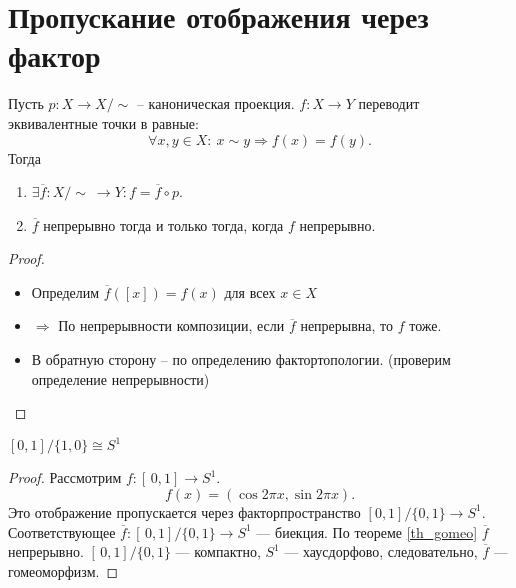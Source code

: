 \documentclass[11pt]{book}
\theoremstyle{definition}
\theoremstyle{plain}
\theoremstyle{plain}
\theoremstyle{definition}
\theoremstyle{remark}
\begin{document}
\section{Пропускание отображения через фактор}
\begin{thm}\label{th_gomeo}
    Пусть $ p : X \to  X/ \!\sim $ -- каноническая проекция. $ f: X \to  Y$ переводит эквивалентные точки в равные:
    \[
	\forall  x, y \in  X: ~ x \sim y \Longrightarrow f(x) = f(y)
    .\]
    Тогда
    \begin{enumerate}
	\item $ \exists  \overline{f}: X /\!\sim~ \to  Y: f = \overline{f} \circ p$.
	\item  $ \overline{f}$ непрерывно тогда и только тогда, когда  $ f$ непрерывно.
    \end{enumerate}
\end{thm}
\begin{proof}
    $ $
    \begin{itemize}
	\item Определим $ \overline{f}([x]) = f(x)$ для всех $ x \in X$
	\item $ \boxed{ \Longrightarrow }$ По непрерывности композиции, если $ \overline{f}$ непрерывна, то $ f$ тоже.
	\item \boxed{ \Longleftarrow } В обратную сторону -- по определению фактортопологии. (проверим определение непрерывности)
    \end{itemize}
\end{proof}
\begin{thm}
    $ [0, 1] / \{1, 0\} \cong S^{1}$
\end{thm}
\begin{proof}
    Рассмотрим $ f: [\,0,1] \to  S^{1}$.
    \[
	f(x) = (\cos 2\pi x, \sin 2 \pi x)
    .\]
    Это отображение пропускается через факторпространство $ [0, 1]/\{0, 1\} \to  S^{1}$.
    Соответствующее $ \overline{f}: [\,0, 1] /\{0, 1\} \to  S^{1}$ --- биекция. По теореме \ref{th_gomeo} $ \overline{f}$ непрерывно.
    $ [\,0, 1]/\{0, 1\}$ --- компактно, $ S^{1}$ --- хаусдорфово, следовательно, $ \overline{f}$ --- гомеоморфизм.
\end{proof}
\end{document}
